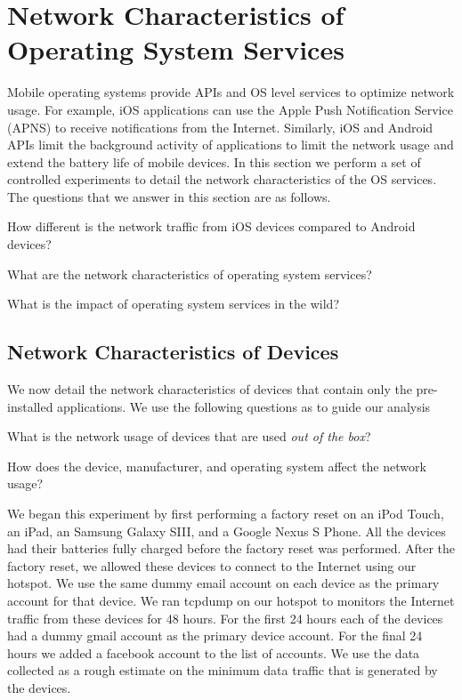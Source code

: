 \section{Network Characteristics of Operating System Services}
\label{sec:characterize-os}

Mobile operating systems provide APIs and OS level services to optimize network usage.
For example, iOS applications can use the Apple Push Notification Service (APNS) to receive notifications from the Internet. 
Similarly, iOS and Android APIs limit the background activity of applications to limit the network usage and extend the battery life of mobile devices. 
In this section we perform a set of controlled experiments to detail the network characteristics of the OS services.
The questions that we answer in this section are as follows.
\begin{packedenumerate}
\item How different is the network traffic from iOS devices compared to Android devices?
\item What are the network characteristics of operating system services?
\item What is the impact of operating system services in the wild? 
\end{packedenumerate}

\subsection{Network Characteristics of  Devices}

We now detail the network characteristics of devices that contain only the pre-installed applications.
We use the following questions as to guide our analysis
\begin{packedenumerate}
\item What is the network usage of devices that are used \emph{out of the box}? 
\item How does the device, manufacturer, and operating system affect the network usage?
\end{packedenumerate}

We began this experiment by first performing a factory reset on an iPod Touch, an iPad, an Samsung Galaxy SIII, and a Google Nexus S Phone.
All the devices had their batteries fully charged before the factory reset was performed. 
After the factory reset, we allowed these devices to connect to the Internet using our \wifi hotspot.
We use the same dummy email account on each device as the primary account for that device. 
We ran tcpdump on our hotspot to monitors the Internet traffic from these devices for 48 hours. 
For the first 24 hours each of the devices had a dummy gmail account as the primary device account.
For the final 24 hours we added a facebook account to the list of accounts.  
We use the data collected as a rough estimate on the minimum data traffic that is generated by the devices. 



